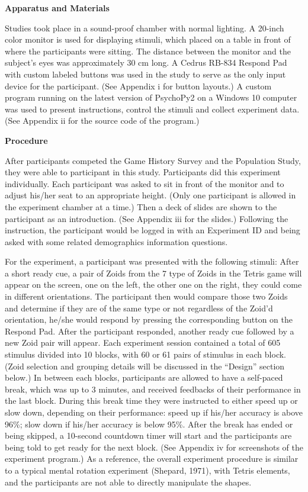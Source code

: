 \documentclass{article}
\begin{document}
	\noindent \textbf{Apparatus and Materials}
	
	Studies took place in a sound-proof chamber with normal lighting. A 20-inch color monitor is used for displaying stimuli, which placed on a table in front of where the participants were sitting. The distance between the monitor and the subject's eyes was approximately 30 cm long. A Cedrus{\circledR} RB-834 Respond Pad with custom labeled buttons was used in the study to serve as the only input device for the participant. (See Appendix i for button layouts.) A custom program running on the latest version of PsychoPy2 on a Windows 10 computer was used to present instructions, control the stimuli and collect experiment data. (See Appendix ii for the source code of the program.)
	
	\noindent \textbf{Procedure}
	
	\textbf{ }After participants competed the Game History Survey and the Population Study, they were able to participant in this study. Participants did this experiment individually. Each participant was asked to sit in front of the monitor and to adjust his/her seat to an appropriate height. (Only one participant is allowed in the experiment chamber at a time.) Then a deck of slides are shown to the participant as an introduction. (See Appendix iii for the slides.) Following the instruction, the participant would be logged in with an Experiment ID and being asked with some related demographics information questions.
	
	For the experiment, a participant was presented with the following stimuli: After a short ready cue, a pair of Zoids from the 7 type of Zoids in the Tetris game will appear on the screen, one on the left, the other one on the right, they could come in different orientations. The participant then would compare those two Zoids and determine if they are of the same type or not regardless of the Zoid'd orientation, he/she would respond by pressing the corresponding button on the Respond Pad. After the participant responded, another ready cue followed by a new Zoid pair will appear. Each experiment session contained a total of 605 stimulus divided into 10 blocks, with 60 or 61 pairs of stimulus in each block. (Zoid selection and grouping details will be discussed in the ``Design'' section below.) In between each blocks, participants are allowed to have a self-paced break, which was up to 3 minutes, and received feedbacks of their performance in the last block. During this break time they were instructed to either speed up  or slow down, depending on their performance: speed up if his/her accuracy is above 96\%; slow down if his/her accuracy is below 95\%. After the break has ended or being skipped, a 10-second countdown timer will start and the participants are being told to get ready for the next block. (See Appendix iv for screenshots of the experiment program.) As a reference, the overall experiment procedure is similar to a typical mental rotation experiment (Shepard, 1971), with Tetris elements, and the participants are not able to directly manipulate the shapes. 
	
\end{document}
